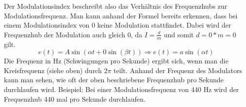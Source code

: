 Der Modulationsindex beschreibt also das Verhältnis des Frequenzhubs zur Modulationsfrequenz.
Man kann anhand der Formel bereits erkennen, dass bei einem Modulationsindex von 0 keine Modulation stattfindet. Dabei wird der Frequenzhub der Modulation auch gleich 0, da $ I=\frac{d}{m} $ und somit $ d = 0*m = 0 $ gilt. 
\[ e(t) = A \sin(\alpha t + 0 \sin(\beta t))  \Rightarrow  e(t) = a \sin(\alpha t) \]
Die Frequenz in Hz (Schwingungen pro Sekunde) ergibt sich, wenn man die Kreisfrequenz (siehe oben) durch $2\pi$ teilt.
Anhand der Frequenz des Modulators kann man sehen, wie oft der oben beschriebene Frequenzhub pro Sekunde durchlaufen wird. Beispiel: Bei einer Modulationsfrequenz von 440 Hz wird der Frequenzhub 440 mal pro Sekunde durchlaufen.
